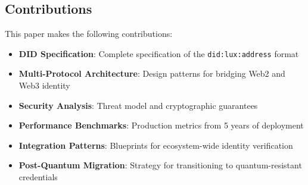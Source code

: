 \subsection{Contributions}

This paper makes the following contributions:

\begin{itemize}
  \item \textbf{DID Specification}: Complete specification of the \texttt{did:lux:address} format
  \item \textbf{Multi-Protocol Architecture}: Design patterns for bridging Web2 and Web3 identity
  \item \textbf{Security Analysis}: Threat model and cryptographic guarantees
  \item \textbf{Performance Benchmarks}: Production metrics from 5 years of deployment
  \item \textbf{Integration Patterns}: Blueprints for ecosystem-wide identity verification
  \item \textbf{Post-Quantum Migration}: Strategy for transitioning to quantum-resistant credentials
\end{itemize}

